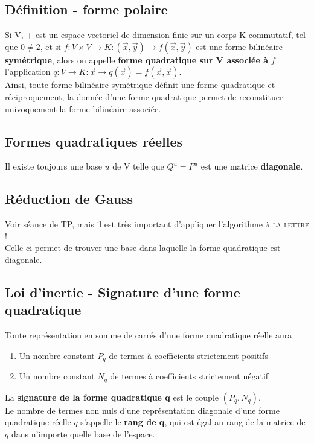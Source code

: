 \documentclass[12pt, a4paper]{article}
\begin{document}
\subsection{Définition - forme polaire}
Si V, + est un espace vectoriel de dimension finie sur un corps K commutatif, tel que $0 \neq 2$, et si $f : V \times V \rightarrow K : (\vec{x}, \vec{y}) \rightarrow f(\vec{x}, \vec{y})$ est une forme bilinéaire \textbf{symétrique}, alors on appelle \textbf{forme quadratique sur V associée à} $f$ l'application $q : V \rightarrow K : \vec{x} \rightarrow q(\vec{x}) = f(\vec{x}, \vec{x})$.\\

Ainsi, toute forme bilinéaire symétrique définit une forme quadratique et réciproquement, la donnée d'une forme quadratique permet de reconstituer univoquement la forme bilinéaire associée.

\subsection{Formes quadratiques réelles}
Il existe toujours une base $u$ de V telle que $Q^u = F^u$ est une matrice \textbf{diagonale}.

\subsection{Réduction de Gauss}
Voir séance de TP, mais il est très important d'appliquer l'algorithme \textsc{à la lettre} !\\
Celle-ci permet de trouver une base dans laquelle la forme quadratique est diagonale.

\subsection{Loi d'inertie - Signature d'une forme quadratique}
Toute représentation en somme de carrés d'une forme quadratique réelle aura 
\begin{enumerate}
\item Un nombre constant $P_q$ de termes à coefficients strictement positifs
\item Un nombre constant $N_q$ de termes à coefficients strictement négatif
\end{enumerate}
La \textbf{signature de la forme quadratique q} est le couple $(P_q, N_q)$.\\

Le nombre de termes non nuls d'une représentation diagonale d'une forme quadratique réelle $q$ s'appelle le \textbf{rang de q}, qui est égal au rang de la matrice de $q$ dans n'importe quelle base de l'espace.
\end{document}
